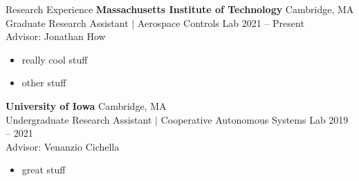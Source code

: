 \begin{rSection}{Research Experience}
{\bf Massachusetts Institute of Technology} \hfill Cambridge, MA \\ 
Graduate Research Assistant $|$ Aerospace Controls Lab \hfill 2021 -- Present \\
Advisor: Jonathan How
\begin{itemize}
    \item really cool stuff
    \item other stuff
\end{itemize}
{\bf University of Iowa} \hfill Cambridge, MA \\ 
Undergraduate Research Assistant $|$ Cooperative Autonomous Systems Lab \hfill 2019 -- 2021 \\
Advisor: Venanzio Cichella
\begin{itemize}
    \item great stuff
\end{itemize}

\end{rSection}